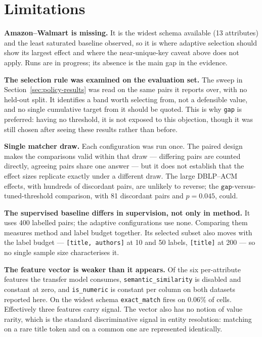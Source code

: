 \documentclass[11pt]{article}
\begin{document}
\section{Limitations}

\textbf{Amazon--Walmart is missing.} It is the widest schema available (13 attributes) and
the least saturated baseline observed, so it is where adaptive selection should show its
largest effect and where the near-unique-key caveat above does not apply. Runs are in
progress; its absence is the main gap in the evidence.

\textbf{The selection rule was examined on the evaluation set.} The sweep in
Section~\ref{sec:policy-results} was read on the same pairs it reports over, with no held-out
split. It identifies a band worth selecting from, not a defensible value, and no single
cumulative target from it should be quoted. This is why \texttt{gap} is preferred: having no
threshold, it is not exposed to this objection, though it was still chosen after seeing these
results rather than before.

\textbf{Single matcher draw.} Each configuration was run once. The paired design makes the
comparisons valid within that draw --- differing pairs are counted directly, agreeing pairs
share one answer --- but it does not establish that the effect sizes replicate exactly under
a different draw. The large DBLP--ACM effects, with hundreds of discordant pairs, are
unlikely to reverse; the $\texttt{gap}$-versus-tuned-threshold comparison, with 81 discordant
pairs and $p = 0.045$, could.

\textbf{The supervised baseline differs in supervision, not only in method.} It uses 400
labelled pairs; the adaptive configurations use none. Comparing them measures method and
label budget together. Its selected subset also moves with the label budget --- 
\texttt{[title, authors]} at 10 and 50 labels, \texttt{[title]} at 200 --- so no single
sample size characterises it.

\textbf{The feature vector is weaker than it appears.} Of the six per-attribute features the
transfer model consumes, \texttt{semantic\_similarity} is disabled and constant at zero, and
\texttt{is\_numeric} is constant per column on both datasets reported here. On the widest
schema \texttt{exact\_match} fires on 0.06\% of cells. Effectively three features carry
signal. The vector also has no notion of value rarity, which is the standard discriminative
signal in entity resolution: matching on a rare title token and on a common one are
represented identically.
\end{document}
